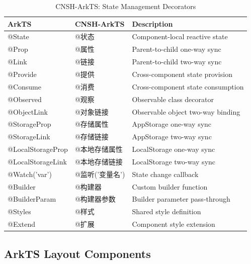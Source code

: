 \begin{table}[h]
\centering
\caption{CNSH-ArkTS: State Management Decorators}
\renewcommand{\arraystretch}{1.3}
\begin{tabular}{llp{5cm}}
\toprule
\textbf{ArkTS} & \textbf{CNSH-ArkTS} & \textbf{Description} \\
\midrule
@State & @状态 & Component-local reactive state \\
@Prop & @属性 & Parent-to-child one-way sync \\
@Link & @链接 & Parent-to-child two-way sync \\
@Provide & @提供 & Cross-component state provision \\
@Consume & @消费 & Cross-component state consumption \\
@Observed & @观察 & Observable class decorator \\
@ObjectLink & @对象链接 & Observable object two-way binding \\
@StorageProp & @存储属性 & AppStorage one-way sync \\
@StorageLink & @存储链接 & AppStorage two-way sync \\
@LocalStorageProp & @本地存储属性 & LocalStorage one-way sync \\
@LocalStorageLink & @本地存储链接 & LocalStorage two-way sync \\
@Watch('var') & @监听('变量名') & State change callback \\
@Builder & @构建器 & Custom builder function \\
@BuilderParam & @构建器参数 & Builder parameter pass-through \\
@Styles & @样式 & Shared style definition \\
@Extend & @扩展 & Component style extension \\
\bottomrule
\end{tabular}
\end{table}

\subsection{ArkTS Layout Components}

